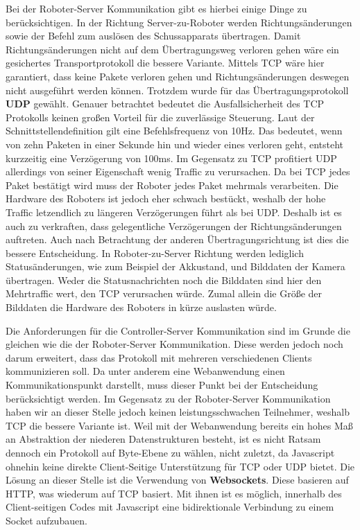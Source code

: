 Bei der Roboter-Server Kommunikation gibt es hierbei einige Dinge zu berücksichtigen. In der Richtung Server-zu-Roboter werden Richtungsänderungen sowie der Befehl zum auslösen des Schussapparats übertragen. Damit Richtungsänderungen nicht auf dem Übertragungsweg verloren gehen wäre ein gesichertes Transportprotokoll die bessere Variante. Mittels TCP wäre hier garantiert, dass keine Pakete verloren gehen und Richtungsänderungen deswegen nicht ausgeführt werden können. Trotzdem wurde für das Übertragungsprotokoll \textbf{UDP} gewählt. Genauer betrachtet bedeutet die Ausfallsicherheit des TCP Protokolls keinen großen Vorteil für die zuverlässige Steuerung. Laut der Schnittstellendefinition %
gilt eine Befehlsfrequenz von 10Hz. Das bedeutet, wenn von zehn Paketen in einer Sekunde hin und wieder eines verloren geht, entsteht kurzzeitig eine Verzögerung von 100ms. Im Gegensatz zu TCP profitiert UDP allerdings von seiner Eigenschaft wenig Traffic zu verursachen. Da bei TCP jedes Paket bestätigt wird muss der Roboter jedes Paket mehrmals verarbeiten. Die Hardware des Roboters ist jedoch eher schwach bestückt, weshalb der hohe Traffic letzendlich zu längeren Verzögerungen führt als bei UDP. Deshalb ist es auch zu verkraften, dass gelegentliche Verzögerungen der Richtungsänderungen auftreten. Auch nach Betrachtung der anderen Übertragungsrichtung ist dies die bessere Entscheidung. In Roboter-zu-Server Richtung werden lediglich Statusänderungen, wie zum Beispiel der Akkustand, und Bilddaten der Kamera übertragen. Weder die Statusnachrichten noch die Bilddaten sind hier den Mehrtraffic wert, den TCP verursachen würde. Zumal allein die Größe der Bilddaten die Hardware des Roboters in kürze auslasten würde.


Die Anforderungen für die Controller-Server Kommunikation sind im Grunde die gleichen wie die der Roboter-Server Kommunikation. Diese werden jedoch noch darum erweitert, dass das Protokoll mit mehreren verschiedenen Clients kommunizieren soll. Da unter anderem eine Webanwendung einen Kommunikationspunkt darstellt, muss dieser Punkt bei der Entscheidung berücksichtigt werden. Im Gegensatz zu der Roboter-Server Kommunikation haben wir an dieser Stelle jedoch keinen leistungsschwachen Teilnehmer, weshalb TCP die bessere Variante ist. Weil mit der Webanwendung bereits ein hohes Maß an Abstraktion der niederen Datenstrukturen besteht, ist es nicht Ratsam dennoch ein Protokoll auf Byte-Ebene zu wählen, nicht zuletzt, da Javascript ohnehin keine direkte Client-Seitige Unterstützung für TCP oder UDP bietet. Die Lösung an dieser Stelle ist die Verwendung von \textbf{Websockets}. Diese basieren auf HTTP, was wiederum auf TCP basiert. Mit ihnen ist es möglich, innerhalb des Client-seitigen Codes mit Javascript eine bidirektionale Verbindung zu einem Socket aufzubauen.  